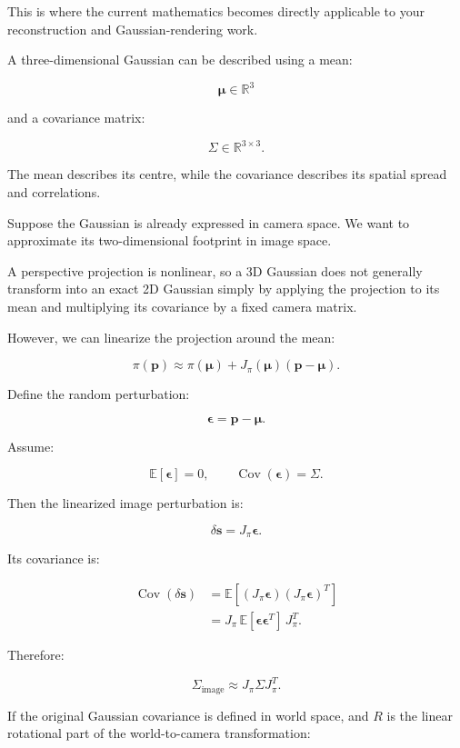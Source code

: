 \hypertarget{02-foundations-ii-ch021-research-bridge-from-jacobians-to-3d-gaussian-splatting}{}

This is where the current mathematics becomes directly applicable to your reconstruction and Gaussian-rendering work.

A three-dimensional Gaussian can be described using a mean:

\[
\boldsymbol\mu\in\mathbb R^3
\]

and a covariance matrix:

\[
\Sigma\in\mathbb R^{3\times3}.
\]

The mean describes its centre, while the covariance describes its spatial spread and correlations.

Suppose the Gaussian is already expressed in camera space. We want to approximate its two-dimensional footprint in image space.

A perspective projection is nonlinear, so a 3D Gaussian does not generally transform into an exact 2D Gaussian simply by applying the projection to its mean and multiplying its covariance by a fixed camera matrix.

However, we can linearize the projection around the mean:

\[
\pi(\mathbf p) \approx \pi(\boldsymbol\mu) + J_\pi(\boldsymbol\mu) (\mathbf p-\boldsymbol\mu).
\]

Define the random perturbation:

\[
\boldsymbol\epsilon=\mathbf p-\boldsymbol\mu.
\]

Assume:

\[
\mathbb E[\boldsymbol\epsilon]=0, \qquad \operatorname{Cov}(\boldsymbol\epsilon)=\Sigma.
\]

Then the linearized image perturbation is:

\[
\delta\mathbf s=J_\pi\boldsymbol\epsilon.
\]

Its covariance is:

\[
\begin{aligned} \operatorname{Cov}(\delta\mathbf s) &=\mathbb E[ (J_\pi\boldsymbol\epsilon) (J_\pi\boldsymbol\epsilon)^T ]\\ &=J_\pi\, \mathbb E[\boldsymbol\epsilon\boldsymbol\epsilon^T]\, J_\pi^T. \end{aligned}
\]

Therefore:

\[
\boxed{ \Sigma_{\text{image}} \approx J_\pi\Sigma J_\pi^T }.
\]

If the original Gaussian covariance is defined in world space, and \(R\) is the linear rotational part of the world-to-camera transformation:

